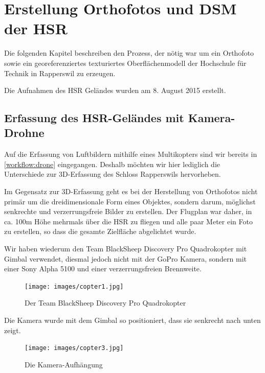 \chapter{Erstellung Orthofotos und DSM der HSR}


Die folgenden Kapitel beschreiben den Prozess, der nötig war um ein Orthofoto
sowie ein georeferenziertes texturiertes Oberflächenmodell der Hochschule für
Technik in Rapperswil zu erzeugen.

Die Aufnahmen des HSR Geländes wurden am 8. August 2015 erstellt.


\section{Erfassung des HSR-Geländes mit Kamera-Drohne}

\label{workflow:hsr:drone}

Auf die Erfassung von Luftbildern mithilfe eines Multikopters sind wir bereits
in \autoref{workflow:drone} eingegangen. Deshalb möchten wir hier lediglich die
Unterschiede zur 3D-Erfassung des Schloss Rapperswils hervorheben.

Im Gegensatz zur 3D-Erfassung geht es bei der Herstellung von Orthofotos nicht
primär um die dreidimensionale Form eines Objektes, sondern darum, möglichst
senkrechte und verzerrungsfreie Bilder zu erstellen. Der Flugplan war daher, in
ca. 100m Höhe mehrmals über die HSR zu fliegen und alle paar Meter ein Foto zu
erstellen, so dass die gesamte Zielfläche abgelichtet wurde.

Wir haben wiederum den Team BlackSheep Discovery Pro Quadrokopter mit Gimbal
verwendet, diesmal jedoch nicht mit der GoPro Kamera, sondern mit einer Sony
Alpha 5100 und einer verzerrungsfreien Brennweite.
\begin{figure}[H]
	\centering
	\texttt{[image: images/copter1.jpg]}
	\caption{Der Team BlackSheep Discovery Pro Quadrokopter}
	\label{img:copter1}
\end{figure}

\noindent Die Kamera wurde mit dem Gimbal so positioniert, dass sie senkrecht
nach unten zeigt.
\begin{figure}[H]
	\centering
	\texttt{[image: images/copter3.jpg]}
	\caption{Die Kamera-Aufhängung}
	\label{img:copter3}
\end{figure}

